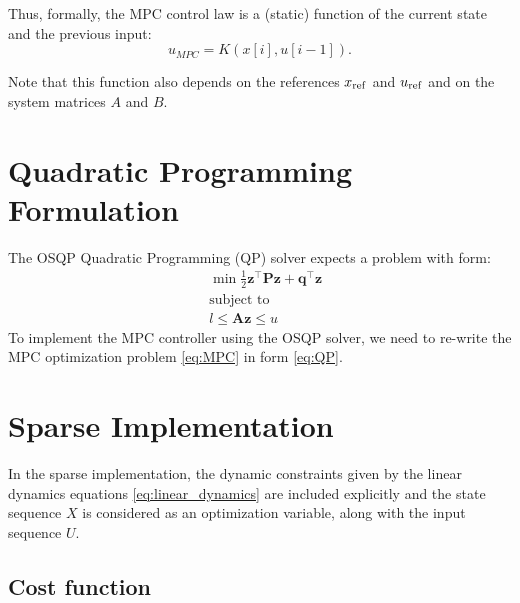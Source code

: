 \documentclass[a4paper,12pt,fleqn]{article}
\newcommand{\lQP}{l}
\newcommand{\uQP}{u}
\newcommand{\AQP}{\mathbf{A}}
\newcommand{\PQP}{\mathbf{P}}
\newcommand{\qQP}{\mathbf{q}}
\newcommand{\xQP}{\mathbf{z}}
\begin{document}
Thus, formally, the MPC control law is a (static) function of the current state and the previous input:
\begin{equation}
 u_{MPC} = K(x[i], u[i-1]).
\end{equation}

Note that this function also depends on the references $x_{\rm ref}$ and $u_{\rm ref}$ and on the system matrices $A$ and $B$.

\section{Quadratic Programming Formulation}
The OSQP Quadratic Programming (QP) solver expects a problem with form: 
\begin{subequations}
\label{eq:QP}
\begin{align}
 &\min \frac{1}{2} \xQP^\top \PQP \xQP +  \qQP^\top \xQP \\
 &\text{subject to} \nonumber \\
 &\lQP \leq \AQP \xQP \leq \uQP
\end{align}
\end{subequations}
To implement the MPC controller using the OSQP solver, we need to re-write the MPC optimization problem \eqref{eq:MPC} in form
\eqref{eq:QP}. 

\section{Sparse Implementation}
In the sparse implementation, the dynamic constraints given by the linear dynamics equations \eqref{eq:linear_dynamics} are included explicitly and 
the state sequence $X$ is considered as an optimization variable, along with the input sequence $U$.

\subsection{Cost function}
\end{document}
